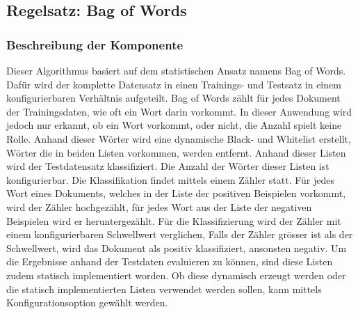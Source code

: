 \subsection{Regelsatz: Bag of Words}
\subsubsection{Beschreibung der Komponente}
Dieser Algorithmus basiert auf dem statistischen Ansatz namens \glqq Bag of Words\grqq{}.
Dafür wird der komplette Datensatz in einen Trainings- und Testsatz in einem konfigurierbaren Verhältnis aufgeteilt.
Bag of Words zählt für jedes Dokument der Trainingsdaten, wie oft ein Wort darin vorkommt.
In dieser Anwendung wird jedoch nur erkannt, ob ein Wort vorkommt, oder nicht, die Anzahl spielt keine Rolle.
Anhand dieser Wörter wird eine dynamische Black- und Whitelist erstellt, Wörter die in beiden Listen vorkommen, werden entfernt.
Anhand dieser Listen wird der Testdatensatz klassifiziert.
Die Anzahl der Wörter dieser Listen ist konfigurierbar.
Die Klassifikation findet mittels einem Zähler statt.
Für jedes Wort eines Dokuments, welches in der Liste der positiven Beispielen vorkommt, wird der Zähler hochgezählt, für jedes Wort aus der Liste der negativen Beispielen wird er heruntergezählt.
Für die Klassifizierung wird der Zähler mit einem konfigurierbaren Schwellwert verglichen, Falls der Zähler grösser ist als der Schwellwert, wird das Dokument als positiv klassifiziert, ansonsten negativ.
Um die Ergebnisse anhand der Testdaten evaluieren zu können, sind diese Listen zudem statisch implementiert worden.
Ob diese dynamisch erzeugt werden oder die statisch implementierten Listen verwendet werden sollen, kann mittels Konfigurationsoption gewählt werden.
